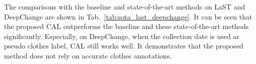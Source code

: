 \documentclass[10pt,twocolumn,letterpaper]{article}
\begin{document}
The comparisons with the baseline and state-of-the-art methods on LaST and DeepChange are shown in Tab.~\ref{tab:sota_last_deepchange}.
It can be seen that the proposed CAL outperforms the baseline and these state-of-the-art methods significantly.
Especially, on DeepChange, when the collection date is used as pseudo clothes label, CAL still works well.
It demonstrates that the proposed method does not rely on accurate clothes annotations.

{\small


}
\end{document}
